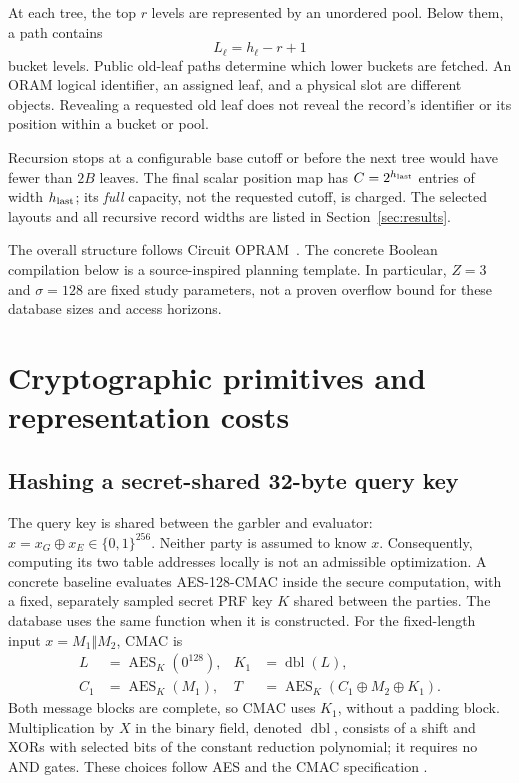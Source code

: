 \documentclass[11pt]{article}
\begin{document}
At each tree, the top $r$ levels are represented by an unordered pool.
Below them, a path contains
\begin{equation}
 L_\ell=h_\ell-r+1
\end{equation}
bucket levels. Public old-leaf paths determine which lower buckets are
fetched. An ORAM logical identifier, an assigned leaf, and a physical slot
are different objects. Revealing a requested old leaf does not reveal the
record's identifier or its position within a bucket or pool.

Recursion stops at a configurable base cutoff or before the next tree would
have fewer than $2B$ leaves. The final scalar position map has
$C=2^{h_{\rm last}}$ entries of width $h_{\rm last}$; its \emph{full} capacity,
not the requested cutoff, is charged. The selected layouts and all recursive
record widths are listed in Section~\ref{sec:results}.

The overall structure follows Circuit OPRAM~\cite{chan2017}. The concrete
Boolean compilation below is a source-inspired planning template. In
particular, $Z=3$ and $\sigma=128$ are fixed study parameters, not a proven
overflow bound for these database sizes and access horizons.

\section{Cryptographic primitives and representation costs}
\label{sec:shuffle-primitives}

\subsection{Hashing a secret-shared 32-byte query key}
The query key is shared between the garbler and evaluator:
$x=x_G\oplus x_E\in\{0,1\}^{256}$.  Neither party is assumed to know $x$.
Consequently, computing its two table addresses locally is not an admissible
optimization.  A concrete baseline evaluates AES-128-CMAC inside the secure
computation, with a fixed, separately sampled secret PRF key $K$ shared between
the parties.  The database uses the same function when it is constructed.
For the fixed-length input $x=M_1\mathbin\Vert M_2$, CMAC is
\begin{align}
 L&=\operatorname{AES}_K(0^{128}), &
 K_1&=\operatorname{dbl}(L),\nonumber\\
 C_1&=\operatorname{AES}_K(M_1), &
 T&=\operatorname{AES}_K(C_1\oplus M_2\oplus K_1).
 \label{eq:shared-cmac}
\end{align}
Both message blocks are complete, so CMAC uses $K_1$, without a padding block.
Multiplication by $X$ in the binary field, denoted $\operatorname{dbl}$, consists
of a shift and XORs with selected bits of the constant reduction polynomial;
it requires no AND gates.  These choices follow AES and the CMAC specification
\cite{aesfips,cmac}.
\end{document}
